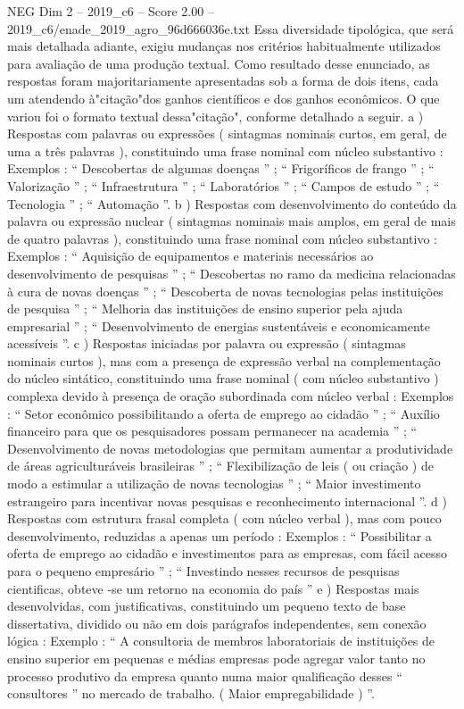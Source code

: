 \begin{textsample}{NEG Dim 2 – 2019\_c6 – Score 2.00 – 2019\_c6/enade\_2019\_agro\_96d666036e.txt}
Essa diversidade tipológica, que será mais detalhada adiante, exigiu mudanças nos critérios habitualmente utilizados para avaliação de uma produção textual.
Como resultado desse enunciado, as respostas foram majoritariamente apresentadas sob a forma de dois itens, cada um atendendo à"citação"dos ganhos científicos e dos ganhos econômicos.
O que variou foi o formato textual dessa"citação", conforme detalhado a seguir. a ) Respostas com palavras ou expressões ( sintagmas nominais curtos, em geral, de uma a três palavras ), constituindo uma frase nominal com núcleo substantivo : Exemplos : “ Descobertas de algumas doenças ” ; “ Frigoríficos de frango ” ; “ Valorização ” ; “ Infraestrutura ” ; “ Laboratórios ” ; “ Campos de estudo ” ; “ Tecnologia ” ; “ Automação ”. b ) Respostas com desenvolvimento do conteúdo da palavra ou expressão nuclear ( sintagmas nominais mais amplos, em geral de mais de quatro palavras ), constituindo uma frase nominal com núcleo substantivo : Exemplos : “ Aquisição de equipamentos e materiais necessários ao desenvolvimento de pesquisas ” ; “ Descobertas no ramo da medicina relacionadas à cura de novas doenças ” ; “ Descoberta de novas tecnologias pelas instituições de pesquisa ” ; “ Melhoria das instituições de ensino superior pela ajuda empresarial ” ; “ Desenvolvimento de energias sustentáveis e economicamente acessíveis ”. c ) Respostas iniciadas por palavra ou expressão ( sintagmas nominais curtos ), mas com a presença de expressão verbal na complementação do núcleo sintático, constituindo uma frase nominal ( com núcleo substantivo ) complexa devido à presença de oração subordinada com núcleo verbal : Exemplos : “ Setor econômico possibilitando a oferta de emprego ao cidadão ” ; “ Auxílio financeiro para que os pesquisadores possam permanecer na academia ” ; “ Desenvolvimento de novas metodologias que permitam aumentar a produtividade de áreas agriculturáveis brasileiras ” ; “ Flexibilização de leis ( ou criação ) de modo a estimular a utilização de novas tecnologias ” ; “ Maior investimento estrangeiro para incentivar novas pesquisas e reconhecimento internacional ”. d ) Respostas com estrutura frasal completa ( com núcleo verbal ), mas com pouco desenvolvimento, reduzidas a apenas um período : Exemplos : “ Possibilitar a oferta de emprego ao cidadão e investimentos para as empresas, com fácil acesso para o pequeno empresário ” ; “ Investindo nesses recursos de pesquisas cientificas, obteve -se um retorno na economia do país ” e ) Respostas mais desenvolvidas, com justificativas, constituindo um pequeno texto de base dissertativa, dividido ou não em dois parágrafos independentes, sem conexão lógica : Exemplo : “ A consultoria de membros laboratoriais de instituições de ensino superior em pequenas e médias empresas pode agregar valor tanto no processo produtivo da empresa quanto numa maior qualificação desses “ consultores ” no mercado de trabalho. ( Maior empregabilidade ) ”.

\end{textsample}

